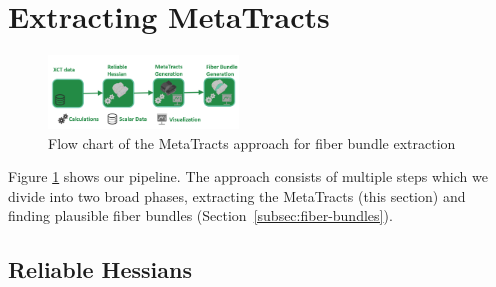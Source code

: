 


\section {Extracting MetaTracts }
\label{sec:approach}

\begin{figure}[tb]
\centering
\includegraphics[width=0.45\textwidth]{imagesMT2014/algo.png}
\caption{Flow chart of the MetaTracts approach for fiber bundle extraction}
\label{fig:flowchart}
\end{figure}

Figure \ref{fig:flowchart} shows our pipeline. The approach consists of multiple steps which we divide into two broad phases, extracting the MetaTracts  (this section) and  finding plausible fiber bundles (Section~\ref{subsec:fiber-bundles}).


\subsection {Reliable Hessians}
\label{subsec:rh}

